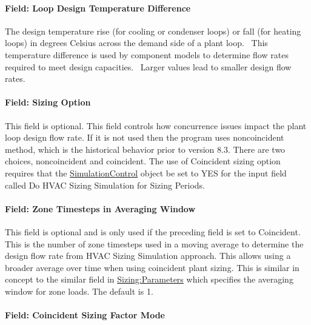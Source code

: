 \paragraph{Field: Loop Design Temperature Difference}\label{field-loop-design-temperature-difference}

The design temperature rise (for cooling or condenser loops) or fall (for heating loops) in degrees Celsius across the demand side of a plant loop.~ This temperature difference is used by component models to determine flow rates required to meet design capacities.~ Larger values lead to smaller design flow rates.

\paragraph{Field: Sizing Option}\label{field-sizing-option}

This field is optional. This field controls how concurrence issues impact the plant loop design flow rate. If it is not used then the program uses noncoincident method, which is the historical behavior prior to version 8.3. There are two choices, noncoincident and coincident. The use of Coincident sizing option requires that the \hyperref[simulationcontrol]{SimulationControl} object be set to YES for the input field called Do HVAC Sizing Simulation for Sizing Periods.

\paragraph{Field: Zone Timesteps in Averaging Window}\label{field-zone-timesteps-in-averaging-window}

This field is optional and is only used if the preceding field is set to Coincident. This is the number of zone timesteps used in a moving average to determine the design flow rate from HVAC Sizing Simulation approach. This allows using a broader average over time when using coincident plant sizing. This is similar in concept to the similar field in \hyperref[sizingparameters]{Sizing:Parameters} which specifies the averaging window for zone loads. The default is 1.

\paragraph{Field: Coincident Sizing Factor Mode}\label{field-coincident-sizing-factor-mode}

